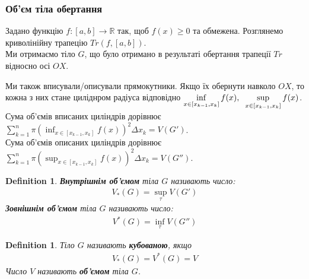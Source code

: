 \documentclass[a4paper, 10pt]{article}
\def\huge{\displaystyle}
\theoremstyle{theoremdd}
\theoremstyle{theoremdd}
\theoremstyle{theoremdd}
\newtheorem{definition}[theorem]{Definition}
\theoremstyle{theoremdd}
\theoremstyle{theoremdd}
\theoremstyle{theoremdd}
\theoremstyle{theoremdd}
\theoremstyle{theoremdd}
\theoremstyle{theoremdd}
\begin{document}
\subsubsection{Об'єм тіла обертання}
Задано функцію $f: [a,b] \to \mathbb{R}$ так, щоб $f(x) \geq 0$ та обмежена. Розглянемо криволінійну трапецію $Tr(f,[a,b])$.\\
Ми отримаємо тіло $G$, що було отримано в результаті обертання трапеції $Tr$ відносно осі $OX$.
\begin{figure}[H]
\centering
{}
\qquad
{}
\end{figure}
Ми також вписували/описували прямокутники. Якщо їх обернути навколо $OX$, то кожна з них стане циліднром радіуса відповідно $\huge\inf_{x \in [x_{k-1},x_k]} f(x), \hspace{0.2cm} \huge\sup_{x \in [x_{k-1},x_k]} f(x)$.\\
Сума об'ємів вписаних циліндрів дорівнює $\huge\sum_{k=1}^n \pi \left( \huge\inf_{x \in [x_{k-1},x_k]} f(x) \right)^2 \Delta x_k = V(G')$.\\
Сума об'ємів описаних циліндрів дорівнює $\huge\sum_{k=1}^n \pi \left( \huge\sup_{x \in [x_{k-1},x_k]} f(x) \right)^2 \Delta x_k = V(G'')$.

\begin{definition}
\textbf{Внутрішнім об'ємом} тіла $G$ називають число:
\begin{align*}
V_*(G) = \huge\sup_{\tau} V(G')
\end{align*}
\textbf{Зовнішнім об'ємом} тіла $G$ називають число:
\begin{align*}
V^*(G) = \huge\inf_{\tau} V(G'')
\end{align*}
\end{definition}

\begin{definition}
Тіло $G$ називають \textbf{кубованою}, якщо
\begin{align*}
V_*(G) = V^*(G) = V
\end{align*}
Число $V$ називають \textbf{об'ємом} тіла $G$.
\end{definition}
\end{document}
